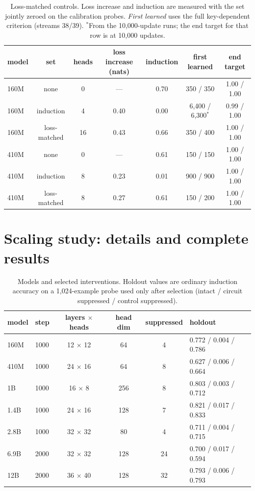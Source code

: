 \begin{table}[!htbp]
\centering\small
\caption{Loss-matched controls. Loss increase and induction are measured with the
set jointly zeroed on the calibration probes. \emph{First learned} uses the full
key-dependent criterion (streams 38/39). $^\ast$From the 10,000-update runs; the
end target for that row is at 10,000 updates.}
\label{tab:lossmatched}
\begin{tabular}{lcccccc}\toprule
model & set & heads & loss increase (nats) & induction & first learned & end target \\
\midrule
160M & none & 0 & --- & 0.70 & 350 / 350 & 1.00 / 1.00 \\
160M & induction & 4 & 0.40 & 0.00 & 6,400 / 6,300$^\ast$ & 0.99 / 1.00 \\
160M & loss-matched & 16 & 0.43 & 0.66 & 350 / 400 & 1.00 / 1.00 \\
410M & none & 0 & --- & 0.61 & 150 / 150 & 1.00 / 1.00 \\
410M & induction & 8 & 0.23 & 0.01 & 900 / 900 & 1.00 / 1.00 \\
410M & loss-matched & 8 & 0.27 & 0.61 & 150 / 200 & 1.00 / 1.00 \\
\bottomrule\end{tabular}
\end{table}

\section{Scaling study: details and complete results}
\label{app:scaling}

\begin{table}[!htbp]
\centering\small
\caption{Models and selected interventions. Holdout values are ordinary induction
accuracy on a 1,024-example probe used only after selection (intact / circuit
suppressed / control suppressed).}
\label{tab:selection}
\begin{tabular}{llcccl}\toprule
model & step & layers $\times$ heads & head dim & suppressed & holdout \\
\midrule
160M & 1000 & 12 $\times$ 12 & 64 & 4 & 0.772 / 0.004 / 0.786 \\
410M & 1000 & 24 $\times$ 16 & 64 & 8 & 0.627 / 0.006 / 0.664 \\
1B & 1000 & 16 $\times$ 8 & 256 & 8 & 0.803 / 0.003 / 0.712 \\
1.4B & 1000 & 24 $\times$ 16 & 128 & 7 & 0.821 / 0.017 / 0.833 \\
2.8B & 1000 & 32 $\times$ 32 & 80 & 4 & 0.711 / 0.004 / 0.715 \\
6.9B & 2000 & 32 $\times$ 32 & 128 & 24 & 0.700 / 0.017 / 0.594 \\
12B & 2000 & 36 $\times$ 40 & 128 & 32 & 0.793 / 0.006 / 0.793 \\
\bottomrule\end{tabular}
\end{table}

